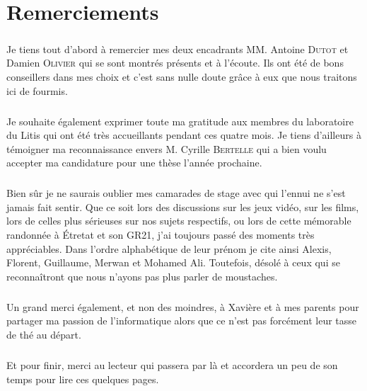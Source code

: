 \documentclass[a4paper, 10pt]{report}
\begin{document}
\newpage

\chapter*{Remerciements}

\paragraph{}Je tiens tout d'abord à remercier mes deux encadrants MM. Antoine \textsc{Dutot} et Damien \textsc{Olivier} qui se sont montrés présents et à l'écoute. Ils ont été de bons conseillers dans mes choix et c'est sans nulle doute grâce à eux que nous traitons ici de fourmis.

\paragraph{}Je souhaite également exprimer toute ma gratitude aux membres du laboratoire du Litis qui ont été très accueillants pendant ces quatre mois. Je tiens d'ailleurs à témoigner ma reconnaissance envers M. Cyrille \textsc{Bertelle} qui a bien voulu accepter ma candidature pour une thèse l'année prochaine.

\paragraph{}Bien sûr je ne saurais oublier mes camarades de stage avec qui l'ennui ne s'est jamais fait sentir. Que ce soit lors des discussions sur les jeux vidéo, sur les films, lors de celles plus sérieuses sur nos sujets respectifs, ou lors de cette mémorable randonnée à Étretat et son GR21, j'ai toujours passé des moments très appréciables. Dans l'ordre alphabétique de leur prénom je cite ainsi Alexis, Florent, Guillaume, Merwan et Mohamed Ali. 
Toutefois, désolé à ceux qui se reconnaîtront que nous n'ayons pas plus parler de moustaches.

\paragraph{}Un grand merci également, et non des moindres, à Xavière et à mes parents pour partager ma passion de l'informatique alors que ce n'est pas forcément leur tasse de thé au départ.

\paragraph{}Et pour finir, merci au lecteur qui passera par là et accordera un peu de son temps pour lire ces quelques pages.
\end{document}
